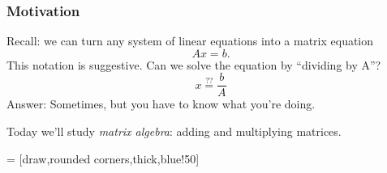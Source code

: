 
\usetikzlibrary{matrix,shapes.geometric,angles}




\begin{frame}
\frametitle{Motivation}

\alert{Recall:} we can turn any system of linear equations into a matrix
equation
\[ Ax = b. \]
\pause
This notation is suggestive.  Can we solve the equation by ``dividing by A''?
\[ x \overset{??}= \frac bA \]
\pause
\alert{Answer:} Sometimes, but you have to know what you're doing.

\pause\bigskip
Today we'll study \emph{matrix algebra}: adding and multiplying matrices.

\end{frame}



\long{}

 = [draw,rounded corners,thick,blue!50]

